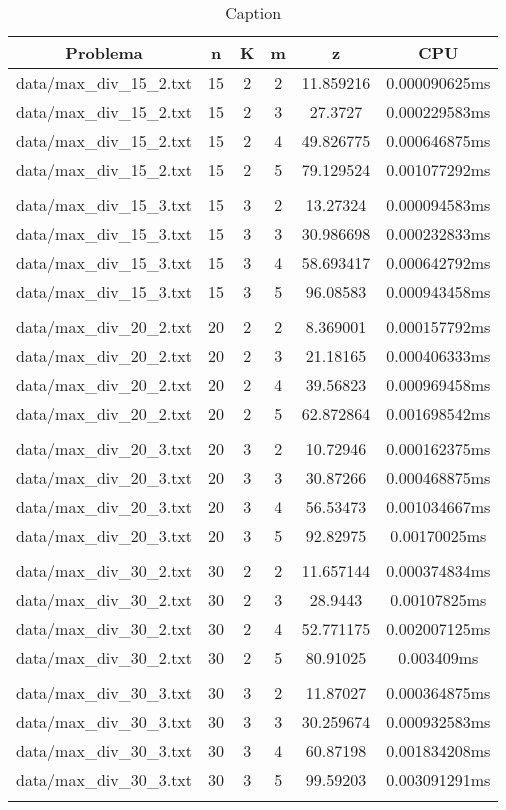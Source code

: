 \begin{table}[h]
\centering
\begin{tabular}{|c|c|c|c|c|c|}
\hline
Problema &  n &  K &  m &  z &  CPU \\
\hline
data/max\_div\_15\_2.txt &  15 &  2 &  2 &  11.859216 &  0.000090625ms \\
data/max\_div\_15\_2.txt &  15 &  2 &  3 &  27.3727 &  0.000229583ms \\
data/max\_div\_15\_2.txt &  15 &  2 &  4 &  49.826775 &  0.000646875ms \\
data/max\_div\_15\_2.txt &  15 &  2 &  5 &  79.129524 &  0.001077292ms \\
 \\
data/max\_div\_15\_3.txt &  15 &  3 &  2 &  13.27324 &  0.000094583ms \\
data/max\_div\_15\_3.txt &  15 &  3 &  3 &  30.986698 &  0.000232833ms \\
data/max\_div\_15\_3.txt &  15 &  3 &  4 &  58.693417 &  0.000642792ms \\
data/max\_div\_15\_3.txt &  15 &  3 &  5 &  96.08583 &  0.000943458ms \\
 \\
data/max\_div\_20\_2.txt &  20 &  2 &  2 &  8.369001 &  0.000157792ms \\
data/max\_div\_20\_2.txt &  20 &  2 &  3 &  21.18165 &  0.000406333ms \\
data/max\_div\_20\_2.txt &  20 &  2 &  4 &  39.56823 &  0.000969458ms \\
data/max\_div\_20\_2.txt &  20 &  2 &  5 &  62.872864 &  0.001698542ms \\
 \\
data/max\_div\_20\_3.txt &  20 &  3 &  2 &  10.72946 &  0.000162375ms \\
data/max\_div\_20\_3.txt &  20 &  3 &  3 &  30.87266 &  0.000468875ms \\
data/max\_div\_20\_3.txt &  20 &  3 &  4 &  56.53473 &  0.001034667ms \\
data/max\_div\_20\_3.txt &  20 &  3 &  5 &  92.82975 &  0.00170025ms \\
 \\
data/max\_div\_30\_2.txt &  30 &  2 &  2 &  11.657144 &  0.000374834ms \\
data/max\_div\_30\_2.txt &  30 &  2 &  3 &  28.9443 &  0.00107825ms \\
data/max\_div\_30\_2.txt &  30 &  2 &  4 &  52.771175 &  0.002007125ms \\
data/max\_div\_30\_2.txt &  30 &  2 &  5 &  80.91025 &  0.003409ms \\
 \\
data/max\_div\_30\_3.txt &  30 &  3 &  2 &  11.87027 &  0.000364875ms \\
data/max\_div\_30\_3.txt &  30 &  3 &  3 &  30.259674 &  0.000932583ms \\
data/max\_div\_30\_3.txt &  30 &  3 &  4 &  60.87198 &  0.001834208ms \\
data/max\_div\_30\_3.txt &  30 &  3 &  5 &  99.59203 &  0.003091291ms \\
 \\
\hline
\end{tabular}
\caption{Caption}
\label{tab:my_table}
\end{table}